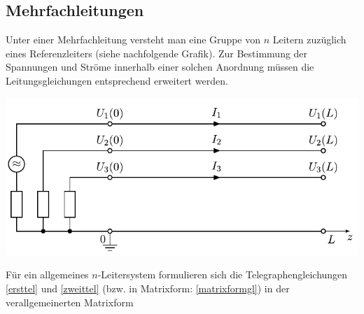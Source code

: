 \subsection{Mehrfachleitungen}
Unter einer Mehrfachleitung versteht man eine Gruppe von $n$ Leitern zuzüglich eines Referenzleiters (siehe nachfolgende Grafik). Zur Bestimmung der Spannungen und Ströme innerhalb einer solchen Anordnung müssen die Leitungsgleichungen entsprechend erweitert werden.
\begin{center}
	\includegraphics{res/LT7}
\end{center}
Für ein allgemeines $n$-Leitersystem formulieren sich die Telegraphengleichungen \ref{ersttel} und \ref{zweittel} (bzw. in Matrixform: \ref{matrixformgl}) in der verallgemeinerten Matrixform
